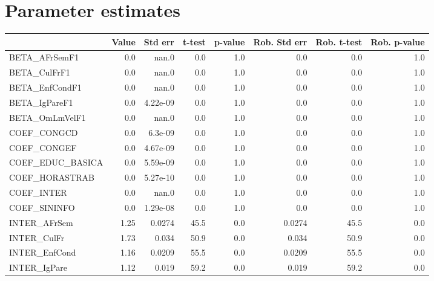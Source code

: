 \section{Parameter estimates}
\begin{tabular}{lrrrrrrr}
\toprule
{} &  Value &  Std err &  t-test &  p-value &  Rob. Std err &  Rob. t-test &  Rob. p-value \\
\midrule
BETA\_AFrSemF1      &    0.0 &    nan.0 &     0.0 &      1.0 &           0.0 &          0.0 &           1.0 \\
BETA\_CulFrF1       &    0.0 &    nan.0 &     0.0 &      1.0 &           0.0 &          0.0 &           1.0 \\
BETA\_EnfCondF1     &    0.0 &    nan.0 &     0.0 &      1.0 &           0.0 &          0.0 &           1.0 \\
BETA\_IgPareF1      &    0.0 & 4.22e-09 &     0.0 &      1.0 &           0.0 &          0.0 &           1.0 \\
BETA\_OmLmVelF1     &    0.0 &    nan.0 &     0.0 &      1.0 &           0.0 &          0.0 &           1.0 \\
COEF\_CONGCD        &    0.0 &  6.3e-09 &     0.0 &      1.0 &           0.0 &          0.0 &           1.0 \\
COEF\_CONGEF        &    0.0 & 4.67e-09 &     0.0 &      1.0 &           0.0 &          0.0 &           1.0 \\
COEF\_EDUC\_BASICA   &    0.0 & 5.59e-09 &     0.0 &      1.0 &           0.0 &          0.0 &           1.0 \\
COEF\_HORASTRAB     &    0.0 & 5.27e-10 &     0.0 &      1.0 &           0.0 &          0.0 &           1.0 \\
COEF\_INTER         &    0.0 &    nan.0 &     0.0 &      1.0 &           0.0 &          0.0 &           1.0 \\
COEF\_SININFO       &    0.0 & 1.29e-08 &     0.0 &      1.0 &           0.0 &          0.0 &           1.0 \\
INTER\_AFrSem       &   1.25 &   0.0274 &    45.5 &      0.0 &        0.0274 &         45.5 &           0.0 \\
INTER\_CulFr        &   1.73 &    0.034 &    50.9 &      0.0 &         0.034 &         50.9 &           0.0 \\
INTER\_EnfCond      &   1.16 &   0.0209 &    55.5 &      0.0 &        0.0209 &         55.5 &           0.0 \\
INTER\_IgPare       &   1.12 &    0.019 &    59.2 &      0.0 &         0.019 &         59.2 &           0.0 \\

\end{tabular}
